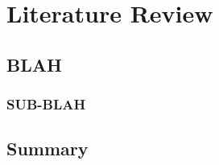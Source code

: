 \chapter{Literature Review}
\label{chap:chap2}

\textit{\fontsize{14pt}{\baselineskip}\selectfont{
		\lipsum[1]
}}
\newpage

\section{BLAH}
\lipsum[1]

\subsection{SUB-BLAH}
\lipsum[2]

\section{Summary}
\lipsum[3]

\cleardoublepage
